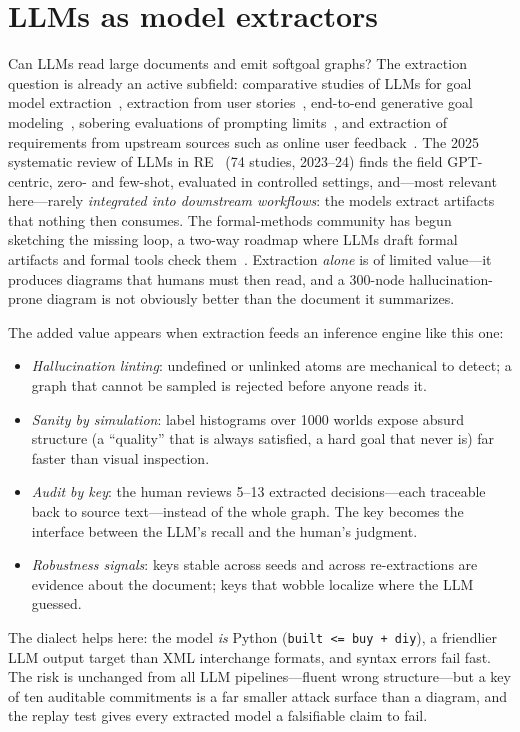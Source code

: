 \documentclass[sigconf,nonacm]{acmart}
\begin{document}
\section{LLMs as model extractors}

Can LLMs read large documents and emit softgoal graphs?
The extraction question is already an active subfield:
comparative studies of LLMs for goal model
extraction~\cite{chen24}, extraction from user
stories~\cite{gunes24}, end-to-end generative goal
modeling~\cite{gengoal25}, sobering evaluations of prompting
limits~\cite{llmgoal26}, and extraction of requirements from
upstream sources such as online user feedback~\cite{feedback25}.
The 2025 systematic review of LLMs in RE~\cite{llm4re25}
(74 studies, 2023--24) finds the field GPT-centric, zero- and
few-shot, evaluated in controlled settings, and---most relevant
here---rarely \emph{integrated into downstream workflows}: the
models extract artifacts that nothing then consumes. The
formal-methods community has begun sketching the missing loop,
a two-way roadmap where LLMs draft formal artifacts and formal
tools check them~\cite{roadmap25,formalsurvey25}. Extraction
\emph{alone} is of limited value---it produces diagrams that
humans must then read, and a 300-node hallucination-prone
diagram is not obviously better than the document it
summarizes.

The added value appears when extraction feeds an inference
engine like this one:

\begin{itemize}
\item \emph{Hallucination linting}: undefined or unlinked atoms
  are mechanical to detect; a graph that cannot be sampled is
  rejected before anyone reads it.
\item \emph{Sanity by simulation}: label histograms over 1000
  worlds expose absurd structure (a ``quality'' that is always
  satisfied, a hard goal that never is) far faster than visual
  inspection.
\item \emph{Audit by key}: the human reviews 5--13 extracted
  decisions---each traceable back to source text---instead of
  the whole graph. The key becomes the interface between the
  LLM's recall and the human's judgment.
\item \emph{Robustness signals}: keys stable across seeds and
  across re-extractions are evidence about the document; keys
  that wobble localize where the LLM guessed.
\end{itemize}

The dialect helps here: the model \emph{is} Python
(\verb|built <= buy + diy|), a friendlier LLM output target
than XML interchange formats, and syntax errors fail fast.
The risk is unchanged from all LLM pipelines---fluent wrong
structure---but a key of ten auditable commitments is a far
smaller attack surface than a diagram, and the replay test
gives every extracted model a falsifiable claim to fail.
\end{document}
